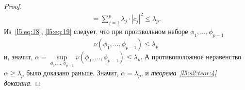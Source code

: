 \begin{proof}
\begin{multline}
		=\sum\limits_{j=1}^{p}\lambda_j\cdot|c_j|^2\leqslant\lambda_p.
	\end{multline}
	Из~\eqref{l5:eq:18}, \eqref{l5:eq:19} следует, что при произвольном наборе $\phi_1,\ldots,\phi_{p-1}$
	\begin{equation*}
		\nu(\phi_1,\ldots,\phi_{p-1})\leqslant\lambda_p
	\end{equation*}
	и{\mb,} значит{\mb,} $\alpha=\sup\limits_{\phi_1,\ldots,\phi_{p-1}}\nu(\phi_1,\ldots,\phi_{p-1})\leqslant\lambda_p$. А противоположное неравенство $\alpha\geqslant\lambda_p$ было доказано раньше. Значит{\mb,} $\alpha=\lambda_p${\mb,} и \emph{теорема~\ref{l5:s2:teor:4} доказана}.
\end{proof}